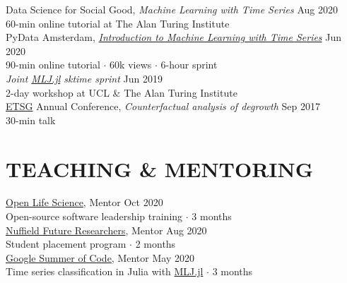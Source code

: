 \documentclass{cv}
\newcommand{\printbibsection}[2]{
\begin{refsection}
\nocite{*}
\printbibliography[sorting=chronological,
                  type={#1},
                  title={#2},
                  heading=none]
\end{refsection}
}
\begin{document}
Data Science for Social Good, \textit{Machine Learning with Time Series} \hfill Aug 2020 \\
{\color{lightgray} 60-min online tutorial at The Alan Turing Institute} \\

PyData Amsterdam, \href{https://www.youtube.com/watch?v=wqQKFu41FIw}{\textit{Introduction to Machine Learning with Time Series}} \hfill Jun 2020 \\
{\color{lightgray} 90-min online tutorial $\cdot$ 60k views $\cdot$ 6-hour sprint} \\

\textit{Joint \href{https://github.com/alan-turing-institute/MLJ.jl}{MLJ.jl} sktime sprint} \hfill Jun 2019 \\
{\color{lightgray} 2-day workshop at UCL \& The Alan Turing Institute} \\

\href{https://www.etsg.org}{ETSG} Annual Conference, \textit{Counterfactual analysis of degrowth} \hfill Sep 2017 \\
{\color{lightgray} 30-min talk} \\


\section{TEACHING \& MENTORING}

\href{https://openlifesci.org}{Open Life Science}, Mentor \hfill Oct 2020 \\
{\color{lightgray} Open-source software leadership training $\cdot$ 3 months}\\

\href{https://www.nuffieldfoundation.org/students-teachers/nuffield-future-researchers}{Nuffield Future Researchers}, Mentor \hfill Aug 2020 \\
{\color{lightgray} Student placement program $\cdot$ 2 months}\\

\href{https://summerofcode.withgoogle.com/archive/2020/projects/6262209727954944/}{Google Summer of Code}, Mentor \hfill May 2020 \\
{\color{lightgray} Time series classification in Julia with  \href{https://github.com/alan-turing-institute/MLJ.jl}{MLJ.jl} $\cdot$ 3 months}\\
\end{document}
